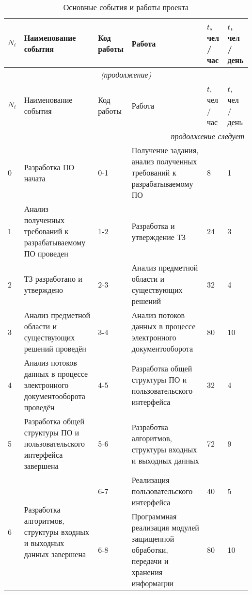\begin{center}
\begin{longtable}[h]{| m{1cm} | m{4cm} | m{1cm} | m{5cm} | m{1cm} | m{1cm} |}
	\caption{Основные события и работы проекта} \label{table:events} \tabularnewline
  \hline


\rowcolor{Gray} \centering  $N_i$  &  \centering Наименование события & \centering Код работы & \centering  Работа &  \centering $t$, чел / час &  \centering $t$,  чел / день \tabularnewline \hline \endfirsthead   \hline
 \multicolumn{6}{|c|}{\small\slshape (продолжение)}        \tabularnewline \hline
 \rowcolor{Gray}  \centering $N_i$  &  \centering Наименование события & \centering  Код работы & \centering   Работа &  \centering$t$, чел / час &  \centering$t$,  чел / день               \tabularnewline \hline
                                              \endhead        \hline
 \multicolumn{6}{|r|}{\small\slshape продолжение следует}  \tabularnewline \hline
                                              \endfoot        \hline
                                              \endlastfoot



 0 & Разработка ПО начата & 0-1 & Получение задания, анализ полученных требований к разрабатываемому ПО & 8 & 1 \tabularnewline \hline

 1 & Анализ полученных требований к разрабатываемому ПО проведен & 1-2 & Разработка и утверждение ТЗ & 24 & 3 \tabularnewline \hline
 
 2 & ТЗ разработано и утверждено & 2-3 & Анализ предметной области и существующих решений & 32 & 4 \tabularnewline \hline
 
 3 & Анализ предметной области и существующих решений проведён & 3-4 & Анализ потоков данных в процессе электронного документооборота & 80 & 10 \tabularnewline \hline
 
 4 & Анализ потоков данных в процессе электронного документооборота проведён & 4-5 & Разработка общей структуры ПО и пользовательского интерфейса & 32 & 4 \tabularnewline \hline
 
 5 & Разработка общей структуры ПО и пользовательского интерфейса завершена & 5-6 & Разработка алгоритмов, структуры входных и выходных данных & 72 & 9 \tabularnewline \hline
 
 \multirow{2}{1cm}{6} & \multirow{2}{4cm}{Разработка алгоритмов, структуры входных и выходных данных завершена} & 6-7 & Реализация пользовательского интерфейса & 40 & 5 \tabularnewline \cline{3-6} 
 & & 6-8 & Программная реализация модулей защищенной обработки, передачи и хранения информации & 80 & 10 \tabularnewline \hline


\end{longtable}
\end{center}
